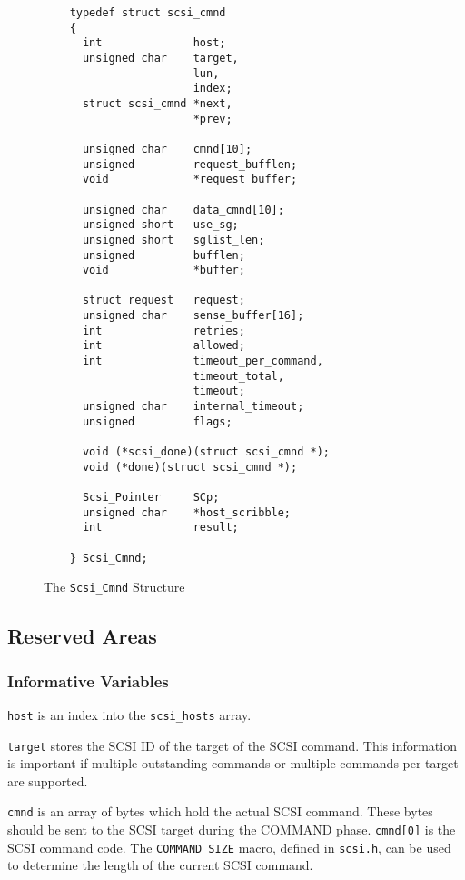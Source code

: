 \begin{figure}[hbtp]
  \leavevmode
  \begin{center}
    \begin{verbatim}
    typedef struct scsi_cmnd
    {
      int              host;
      unsigned char    target,
                       lun,
                       index;
      struct scsi_cmnd *next,
                       *prev;   

      unsigned char    cmnd[10];
      unsigned         request_bufflen;
      void             *request_buffer;

      unsigned char    data_cmnd[10];
      unsigned short   use_sg;
      unsigned short   sglist_len;
      unsigned         bufflen;
      void             *buffer;
        
      struct request   request;
      unsigned char    sense_buffer[16];
      int              retries;
      int              allowed;
      int              timeout_per_command,
                       timeout_total,
                       timeout;
      unsigned char    internal_timeout;
      unsigned         flags;
                
      void (*scsi_done)(struct scsi_cmnd *);  
      void (*done)(struct scsi_cmnd *);

      Scsi_Pointer     SCp;
      unsigned char    *host_scribble;
      int              result;
      
    } Scsi_Cmnd;                 
    \end{verbatim}
    \caption{The {\tt Scsi\_Cmnd} Structure}
    \label{fig:scsi.cmnd}
  \end{center}
\end{figure}

\subsection{Reserved Areas}

\subsubsection{Informative Variables}

\verb|host| is an index into the \verb|scsi_hosts| array.

\verb|target| stores the SCSI ID of the target of the SCSI command.  This
information is important if multiple outstanding commands or multiple
commands per target are supported.

\verb|cmnd| is an array of bytes which hold the actual SCSI command.  These
bytes should be sent to the SCSI target during the COMMAND phase.
\verb|cmnd[0]| is the SCSI command code.  The \verb|COMMAND_SIZE| macro,
defined in \verb|scsi.h|, can be used to determine the length of the
current SCSI command.

